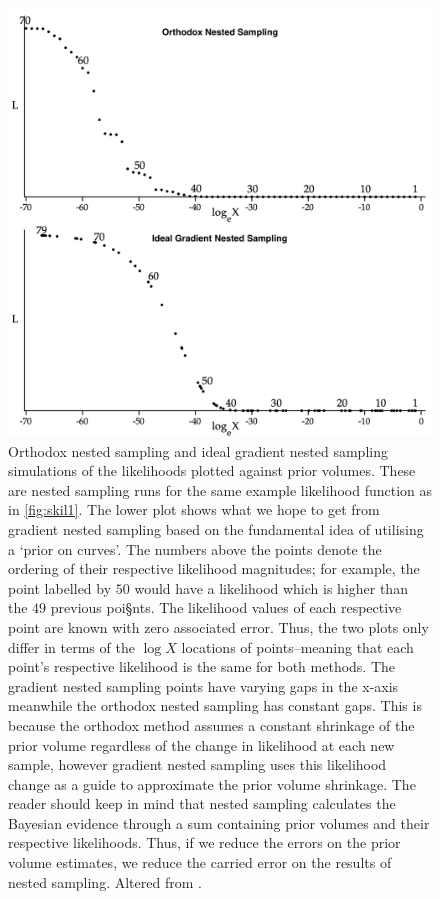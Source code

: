 \begin{figure} 
\centering    
\includegraphics[width=1.0\textwidth]{Chapter2/Figs/Raster/Screenshot 2022-11-08 at 06.33.03.png}
\caption{ Orthodox nested sampling and ideal gradient nested sampling simulations of the likelihoods plotted against prior volumes. These are nested sampling runs for the same example likelihood function as in \cref{fig:skil1}. The lower plot shows what we hope to get from gradient nested sampling based on the fundamental idea of utilising a `prior on curves'. The numbers above the points denote the ordering of their respective likelihood magnitudes; for example, the point labelled by $50$ would have a likelihood which is higher than the $49$ previous poi§nts. The likelihood values of each respective point are known with zero associated error. Thus, the two plots only differ in terms of the $\log X$ locations of points--meaning that each point's respective likelihood is the same for both methods. The gradient nested sampling points have varying gaps in the x-axis meanwhile the orthodox nested sampling has constant gaps. This is because the orthodox method assumes a constant shrinkage of the prior volume regardless of the change in likelihood at each new sample, however gradient nested sampling uses this likelihood change as a guide to approximate the prior volume shrinkage. The reader should keep in mind that nested sampling calculates the Bayesian evidence through a sum containing prior volumes and their respective likelihoods. Thus, if we reduce the errors on the prior volume estimates, we reduce the carried error on the results of nested sampling. Altered from \cite{10.1214/06-BA127}.}
\label{fig:skil2}
\end{figure}

